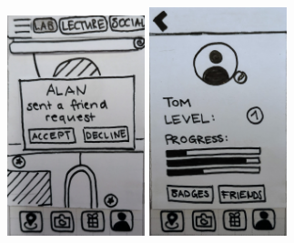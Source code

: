 \documentclass[10pt,twocolumn]{article} %
\begin{document}
\includegraphics[width=0.3\textwidth]{./figures/refined_proto/10.jpg}\hfill
\includegraphics[width=0.3\textwidth]{./figures/refined_proto/11.jpg}\hfill\hfill
\end{document}
